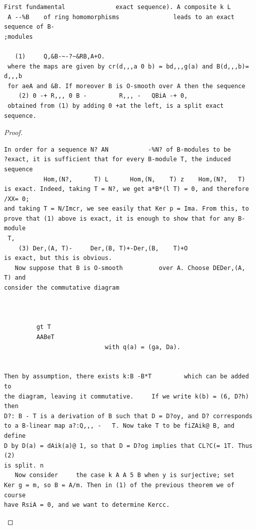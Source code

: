 \begin{theorem}\label{mcrt-auto-theorem-25-1}\uses{}
\begin{verbatim}
First fundamental              exact sequence). A composite k L
 A --%B    of ring homomorphisms               leads to an exact sequence of B-
;modules

   (1)     Q,&B-~-?~&RB,A+O.
 where the maps are given by cr(d,,,a 0 b) = bd,,,g(a) and B(d,,,b)= d,,,b
 for aeA and &B. If moreover B is O-smooth over A then the sequence
    (2) 0 -+ R,,, 0 B -         R,,, -   QBiA -+ 0,
 obtained from (1) by adding 0 +at the left, is a split exact sequence.
\end{verbatim}
\end{theorem}
\begin{proof}
\begin{verbatim}
In order for a sequence N? AN           -%N? of B-modules to be
?exact, it is sufficient that for every B-module T, the induced sequence
           Hom,(N?,      T) L      Hom,(N,    T) z    Hom,(N?,   T)
is exact. Indeed, taking T = N?, we get a*B*(l T) = 0, and therefore /XX= 0;
and taking T = N/Imcr, we see easily that Ker p = Ima. From this, to
prove that (1) above is exact, it is enough to show that for any B-module
 T,
    (3) Der,(A, T)-     Der,(B, T)+-Der,(B,    T)+O
is exact, but this is obvious.
   Now suppose that B is O-smooth          over A. Choose DEDer,(A,                 T) and
consider the commutative diagram



         gt T
         AABeT
                            with q(a) = (ga, Da).


Then by assumption, there exists k:B -B*T         which can be added to
the diagram, leaving it commutative.     If we write k(b) = (6, D?h) then
D?: B - T is a derivation of B such that D = D?oy, and D? corresponds
to a B-linear map a?:Q,,, -   T. Now take T to be fiZAik@ B, and define
D by D(a) = dAik(a)@ 1, so that D = D?og implies that CL?C(= 1T. Thus (2)
is split. n
   Now consider     the case k A A 5 B when y is surjective; set
Ker g = m, so B = A/m. Then in (1) of the previous theorem we of course
have RsiA = 0, and we want to determine Kercc.
\end{verbatim}
\end{proof}


